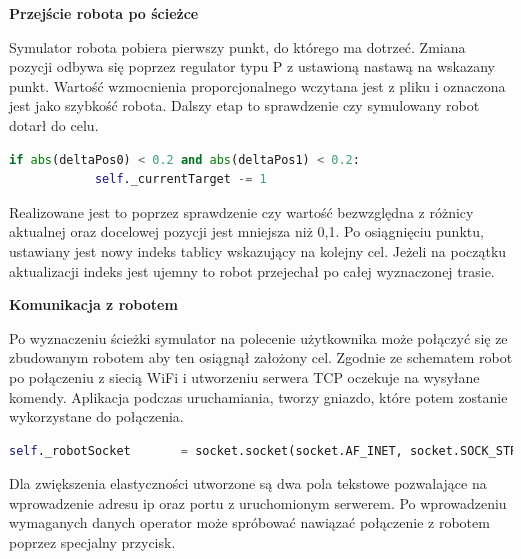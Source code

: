 \textbf{Przejście robota po ścieżce}

Symulator robota pobiera pierwszy punkt, do którego ma dotrzeć. Zmiana pozycji odbywa się poprzez regulator typu P z 
ustawioną nastawą na wskazany punkt. Wartość wzmocnienia proporcjonalnego wczytana jest z pliku i oznaczona jest jako szybkość robota.
Dalszy etap to sprawdzenie czy symulowany robot dotarł do celu. 
\begin{lstlisting}[language=Python,caption=Uruchomienie aplikacji,label={kodPythonSprawdzenieCeluRobota}]
if abs(deltaPos0) < 0.2 and abs(deltaPos1) < 0.2:
            self._currentTarget -= 1
\end{lstlisting}
Realizowane jest to poprzez sprawdzenie czy wartość bezwzględna z różnicy aktualnej oraz docelowej pozycji jest mniejsza niż 0,1.
Po osiągnięciu punktu, ustawiany jest nowy indeks tablicy wskazujący na kolejny cel.
Jeżeli na początku aktualizacji indeks jest ujemny to robot przejechał po całej wyznaczonej trasie.

\textbf{Komunikacja z robotem}

Po wyznaczeniu ścieżki symulator na polecenie użytkownika może połączyć się ze zbudowanym robotem aby ten osiągnął założony cel.
Zgodnie ze schematem \cite{sch:ogolnyRozwiazania} robot po połączeniu z siecią WiFi i utworzeniu serwera TCP oczekuje na wysyłane komendy.
Aplikacja podczas uruchamiania, tworzy gniazdo, które potem zostanie wykorzystane do połączenia. 
\begin{lstlisting}[language=Python,caption=Utworzone gniazdo,label={kodPythonGniazdo}]
self._robotSocket       = socket.socket(socket.AF_INET, socket.SOCK_STREAM)
\end{lstlisting}
Dla zwiększenia elastyczności utworzone są dwa pola tekstowe pozwalające na wprowadzenie adresu ip oraz portu z uruchomionym serwerem.
Po wprowadzeniu wymaganych danych operator może spróbować nawiązać połączenie z robotem poprzez specjalny przycisk.



